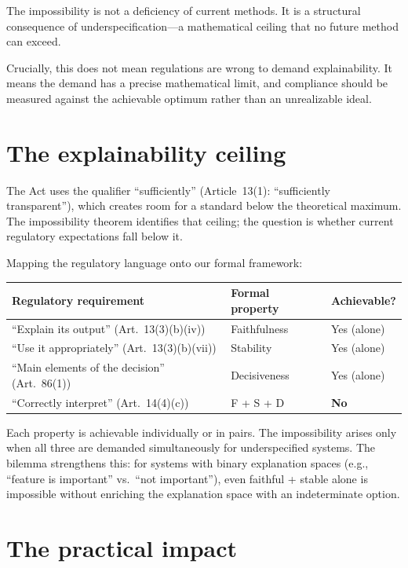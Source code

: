 \documentclass[11pt]{article}
\begin{document}
The impossibility is not a deficiency of current methods.  It is a
structural consequence of underspecification---a mathematical ceiling that no
future method can exceed.

Crucially, this does not mean regulations are wrong to demand explainability.
It means the demand has a precise mathematical limit, and compliance should
be measured against the achievable optimum rather than an unrealizable ideal.

\section*{The explainability ceiling}

The Act uses the qualifier ``sufficiently'' (Article~13(1): ``sufficiently
transparent''), which creates room for a standard below the theoretical
maximum. The impossibility theorem identifies that ceiling; the question
is whether current regulatory expectations fall below it.

Mapping the regulatory language onto our formal framework:

\begin{center}
\begin{tabular}{@{}p{5.5cm}p{2.5cm}p{2.5cm}@{}}
\toprule
\textbf{Regulatory requirement} & \textbf{Formal property} & \textbf{Achievable?} \\
\midrule
``Explain its output'' (Art.~13(3)(b)(iv)) & Faithfulness & Yes (alone) \\
``Use it appropriately'' (Art.~13(3)(b)(vii)) & Stability & Yes (alone) \\
``Main elements of the decision'' (Art.~86(1)) & Decisiveness & Yes (alone) \\
``Correctly interpret'' (Art.~14(4)(c)) & F + S + D & \textbf{No} \\
\bottomrule
\end{tabular}
\end{center}

Each property is achievable individually or in pairs.  The impossibility
arises only when all three are demanded simultaneously for underspecified
systems.  The bilemma strengthens this: for systems with binary explanation
spaces (e.g., ``feature is important'' vs.\ ``not important''), even
faithful + stable alone is impossible without enriching the explanation space
with an indeterminate option.

\section*{The practical impact}
\end{document}
